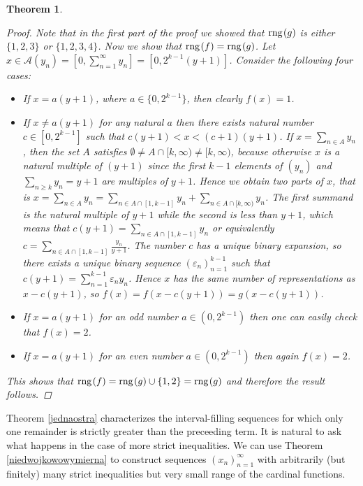 \documentclass{amsart}
\newtheorem{theorem}{Theorem}[section]
\theoremstyle{definition}
\newcommand{\rng}{{\rm rng} \hspace{0.03cm}}
\begin{document}
\begin{theorem}
\begin{proof}
Note that in the first part of the proof we showed that $\rng(g)$ is either $\{1,2,3\}$ or $\{1,2,3,4\}$. Now we show that $\rng(f)=\rng(g)$. Let $x\in \mathcal{A}(y_n)=\left[0,\sum_{n=1}^{\infty}y_n\right]=[0,2^{k-1}(y+1)]$. Consider the following four cases:
\begin{itemize}
\item If $x=a(y+1)$, where $a\in\{0,2^{k-1}\}$, then clearly $f(x)=1$.
\item If $x\neq a(y+1)$ for any natural $a$ then there exists natural number $c\in [0,2^{k-1}]$ such that $c(y+1)<x<(c+1)(y+1)$. If $x=\sum_{n\in A} y_n$, then the set $A$ satisfies $\emptyset\neq A\cap [k,\infty)\neq  [k,\infty)$, because otherwise $x$ is a natural multiple of $(y+1)$ since the first $k-1$ elements of $(y_n)$ and $\sum_{n\geq k} y_n=y+1$ are multiples of $y+1$. Hence we obtain two parts of $x$, that is $x=\sum_{n\in A} y_n=\sum_{n\in A\cap [1,k-1]} y_n+\sum_{n\in A\cap[k,\infty)} y_n$. The first summand is the natural multiple of $y+1$ while the second is less than $y+1$, which means that $c(y+1)=\sum_{n\in A\cap [1,k-1]} y_n$ or equivalently  $c=\sum_{n\in A\cap [1,k-1]} \frac{y_n}{y+1}$.
The number $c$ has a unique binary expansion, so there exists a unique binary sequence $(\varepsilon_n)_{n=1}^{k-1}$ such that $c(y+1)=\sum_{n=1}^{k-1}\varepsilon_{n}y_n$. Hence $x$ has the same number of representations as $x-c(y+1)$, so $f(x)=f(x-c(y+1))=g(x-c(y+1))$. 
\item If $x=a(y+1)$ for an odd number $a\in (0,2^{k-1})$ then one can easily check that $f(x)=2$.
\item If $x=a(y+1)$ for an even number $a\in (0,2^{k-1})$ then again $f(x)=2$.
\end{itemize}
This shows that $\rng(f)=\rng(g)\cup\{1,2\}=\rng(g)$ and therefore the result follows.
\end{proof}
\end{theorem}

Theorem \ref{jednaostra} characterizes the interval-filling sequences for which only one remainder is strictly greater than the preceeding term. It is natural to ask what happens in the case of more strict inequalities. We can use Theorem \ref{niedwojkowowymierna} to construct sequences $(x_{n})_{n=1}^{\infty}$ with arbitrarily (but finitely) many strict inequalities but very small range of the cardinal functions.
\end{document}
